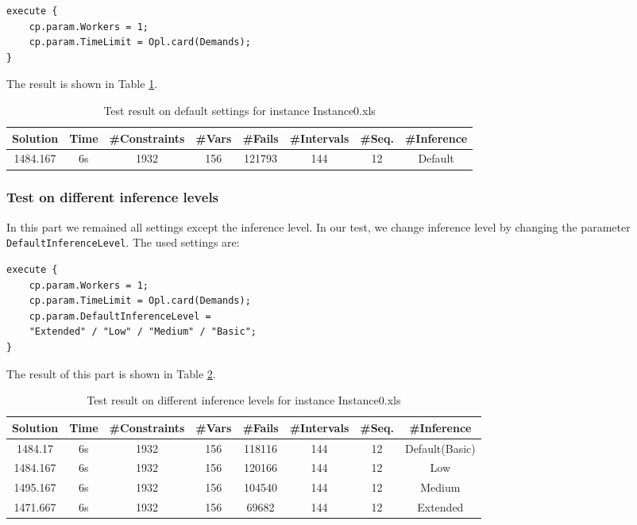 \documentclass[a4paper, 12pt]{article}
\begin{document}
\begin{lstlisting}
execute {
    cp.param.Workers = 1;
    cp.param.TimeLimit = Opl.card(Demands); 
}
\end{lstlisting}

The result is shown in Table \ref{default0}. 

\begin{table}
    \centering
    \caption{Test result on default settings for instance Instance0.xls}
    \label{default0}
    \begin{tabular}{|c|c|c|c|c|c|c|c|}
        \hline
        Solution & Time & \#Constraints & \#Vars & \#Fails & \#Intervals & \#Seq. & \#Inference \\
        \hline
        1484.167 & 6s & 1932 & 156 & 121793 & 144 & 12 & Default \\
        \hline
    \end{tabular}
\end{table}

\subsubsection{Test on different inference levels}

In this part we remained all settings except the inference level. In our test, we change inference level by changing the parameter \texttt{DefaultInferenceLevel}. The used settings are: 

\begin{lstlisting}
execute {
    cp.param.Workers = 1;
    cp.param.TimeLimit = Opl.card(Demands); 
    cp.param.DefaultInferenceLevel = 
    "Extended" / "Low" / "Medium" / "Basic";
}
\end{lstlisting}

The result of this part is shown in Table \ref{diffInfer0}. 

\begin{table}
    \centering
    \caption{Test result on different inference levels for instance Instance0.xls}
    \label{diffInfer0}
    \begin{tabular}{|c|c|c|c|c|c|c|c|}
        \hline
        Solution & Time & \#Constraints & \#Vars & \#Fails & \#Intervals & \#Seq. & \#Inference \\
        \hline
        1484.17 & 6s & 1932 & 156 & 118116 & 144 & 12 & Default(Basic) \\
        \hline 
        1484.167 & 6s & 1932 & 156 & 120166 & 144 & 12 & Low \\
        \hline
        1495.167 & 6s & 1932 & 156 & 104540 & 144 & 12 & Medium \\
        \hline
        1471.667 & 6s & 1932 & 156 & 69682 & 144 & 12 & Extended \\
        \hline
    \end{tabular}
\end{table}
\end{document}
